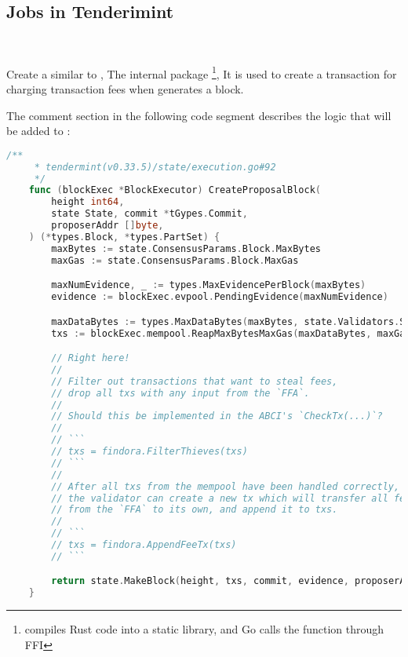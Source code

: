 \subsection{Jobs in Tenderimint} \label{tendermint:CreateProposalBlock}

~\par

Create a  similar to ,
The internal package \footnote{ compiles Rust code into a static library,
and Go calls the function through FFI},
It is used to create a transaction for charging transaction fees
when  generates a block.

The comment section in the following code segment describes the logic
that will be added to :

\begin{lstlisting}[language=go]
    /**
     * tendermint(v0.33.5)/state/execution.go#92
     */
    func (blockExec *BlockExecutor) CreateProposalBlock(
        height int64,
        state State, commit *tGypes.Commit,
        proposerAddr []byte,
    ) (*types.Block, *types.PartSet) {
        maxBytes := state.ConsensusParams.Block.MaxBytes
        maxGas := state.ConsensusParams.Block.MaxGas

        maxNumEvidence, _ := types.MaxEvidencePerBlock(maxBytes)
        evidence := blockExec.evpool.PendingEvidence(maxNumEvidence)

        maxDataBytes := types.MaxDataBytes(maxBytes, state.Validators.Size(), len(evidence))
        txs := blockExec.mempool.ReapMaxBytesMaxGas(maxDataBytes, maxGas)

        // Right here!
        //
        // Filter out transactions that want to steal fees,
        // drop all txs with any input from the `FFA`.
        //
        // Should this be implemented in the ABCI's `CheckTx(...)`?
        //
        // ```
        // txs = findora.FilterThieves(txs)
        // ```
        //
        // After all txs from the mempool have been handled correctly,
        // the validator can create a new tx which will transfer all fees
        // from the `FFA` to its own, and append it to txs.
        //
        // ```
        // txs = findora.AppendFeeTx(txs)
        // ```

        return state.MakeBlock(height, txs, commit, evidence, proposerAddr)
    }
\end{lstlisting}
